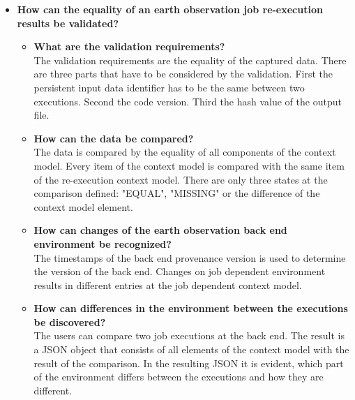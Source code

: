 \documentclass[draft,final]{vutinfth} %
\begin{document}
\begin{itemize}
\begin{itemize}
	\end{itemize}
	\item \textbf{How can the equality of an earth observation job re-execution results be validated?}
	\begin{itemize}
		\item \textbf{What are the validation requirements?} \\
		The validation requirements are the equality of the captured data. There are three parts that have to be considered by the validation. First the persistent input data identifier has to be the same between two executions. Second the code version. Third the hash value of the output file.
		\item \textbf{How can the data be compared?} \\
		The data is compared by the equality of all components of the context model. Every item of the context model is compared with the same item of the re-execution context model. There are only three states at the comparison defined: "EQUAL", "MISSING" or the difference of the context model element.
		\item \textbf{How can changes of the earth observation back end environment be recognized?} \\
		The timestamps of the back end provenance version is used to determine the version of the back end. Changes on job dependent environment results in different entries at the job dependent context model.  
		\item \textbf{How can differences in the environment between the executions be discovered?} \\
		The users can compare two job executions at the back end. The result is a JSON object that consists of all elements of the context model with the result of the comparison. In the resulting JSON it is evident, which part of the environment differs between the executions and how they are different.  
	\end{itemize}
\end{itemize}
\end{document}
